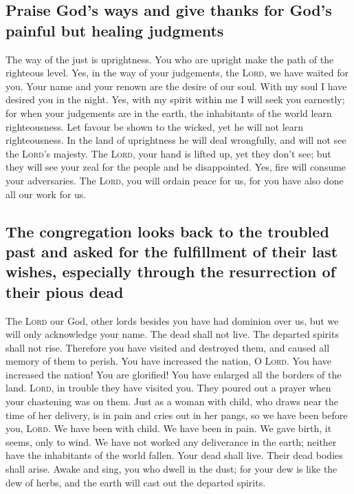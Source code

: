 \hypertarget{praise-gods-ways-and-give-thanks-for-gods-painful-but-healing-judgments}{%
\subsection{Praise God's ways and give thanks for God's painful but
healing
judgments}\label{praise-gods-ways-and-give-thanks-for-gods-painful-but-healing-judgments}}

 The way of the just is uprightness. You who are upright
make the path of the righteous level.  Yes, in the way of
your judgements, the \textsc{Lord}, we have waited for you. Your name
and your renown are the desire of our soul.  With my soul
I have desired you in the night. Yes, with my spirit within me I will
seek you earnestly; for when your judgements are in the earth, the
inhabitants of the world learn righteousness.  Let favour
be shown to the wicked, yet he will not learn righteousness. In the land
of uprightness he will deal wrongfully, and will not see the
\textsc{Lord}'s majesty.  The \textsc{Lord}, your hand is
lifted up, yet they don't see; but they will see your zeal for the
people and be disappointed. Yes, fire will consume your adversaries.
 The \textsc{Lord}, you will ordain peace for us, for you
have also done all our work for us.

\hypertarget{the-congregation-looks-back-to-the-troubled-past-and-asked-for-the-fulfillment-of-their-last-wishes-especially-through-the-resurrection-of-their-pious-dead}{%
\subsection{The congregation looks back to the troubled past and asked
for the fulfillment of their last wishes, especially through the
resurrection of their pious
dead}\label{the-congregation-looks-back-to-the-troubled-past-and-asked-for-the-fulfillment-of-their-last-wishes-especially-through-the-resurrection-of-their-pious-dead}}

 The \textsc{Lord} our God, other lords besides you have
had dominion over us, but we will only acknowledge your name.
 The dead shall not live. The departed spirits shall not
rise. Therefore you have visited and destroyed them, and caused all
memory of them to perish.  You have increased the nation,
O \textsc{Lord}. You have increased the nation! You are glorified! You
have enlarged all the borders of the land. 
\textsc{Lord}, in trouble they have visited you. They poured out a
prayer when your chastening was on them.  Just as a woman
with child, who draws near the time of her delivery, is in pain and
cries out in her pangs, so we have been before you, \textsc{Lord}.
 We have been with child. We have been in pain. We gave
birth, it seems, only to wind. We have not worked any deliverance in the
earth; neither have the inhabitants of the world fallen. 
Your dead shall live. Their dead bodies shall arise. Awake and sing, you
who dwell in the dust; for your dew is like the dew of herbs, and the
earth will cast out the departed spirits.

